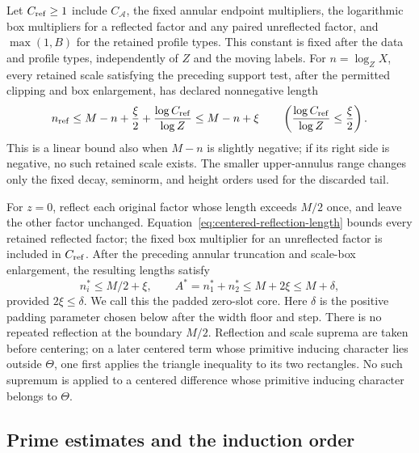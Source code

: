 \documentclass[11pt,a4paper]{article}
\numberwithin{equation}{section}
\numberwithin{figure}{section}
\theoremstyle{definition}
\theoremstyle{remark}
\begin{document}
Let \(C_{\rm ref}\ge1\) include \(C_{\mathcal A}\), the fixed annular
endpoint multipliers, the logarithmic box multipliers for a reflected
factor and any paired unreflected factor, and \(\max(1,B)\) for the
retained profile types.  This constant is fixed after the data and
profile types, independently of \(Z\) and the moving labels.  For
\(n=\log_ZX\), every retained scale satisfying the preceding support
test, after the permitted clipping and box enlargement, has declared
nonnegative length
\begin{equation}
 n_{\rm ref}\le M-n+\frac\xi2+\frac{\log C_{\rm ref}}{\log Z}
 \le M-n+\xi
 \qquad\left(\frac{\log C_{\rm ref}}{\log Z}\le\frac\xi2\right).
 \label{eq:centered-reflection-length}
\end{equation}
This is a linear bound also when \(M-n\) is slightly negative; if its
right side is negative, no such retained scale exists.  The smaller
upper-annulus range changes only the fixed decay, seminorm, and height
orders used for the discarded tail.

For \(z=0\), reflect each original factor whose length exceeds \(M/2\)
once, and leave the other factor unchanged.  Equation~\eqref{eq:centered-reflection-length}
bounds every retained reflected factor; the fixed box multiplier for
an unreflected factor is included in \(C_{\rm ref}\).  After the preceding
annular truncation and scale-box enlargement, the resulting lengths
satisfy
\begin{equation}
 n_i^*\le M/2+\xi,\qquad
 A^*=n_1^*+n_2^*\le M+2\xi\le M+\delta,
 \label{old-eq:2.1h}
\end{equation}
provided \(2\xi\le\delta\).  We call this the padded zero-slot core.
Here \(\delta\) is the positive padding parameter chosen below after the
width floor and step.
There is no repeated reflection at the boundary \(M/2\).  Reflection
and scale suprema are taken before centering; on a later centered term
whose primitive inducing character lies outside \(\Theta\), one first
applies the triangle inequality to its two rectangles.  No such supremum
is applied to a centered difference whose primitive inducing character
belongs to \(\Theta\).

\subsection{Prime estimates and the induction order}\label{sec:weighted}
\end{document}
